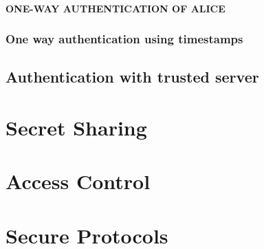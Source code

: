 	\paragraph{ONE-WAY AUTHENTICATION OF ALICE\\}
	
	
	
	\subsubsection{One way authentication using timestamps}
	
	\subsection{Authentication with trusted server}
	
	\newpage
	\section{Secret Sharing}

	\newpage
	\section{Access Control}

	\newpage
	\section{Secure Protocols}
	
	\newpage
